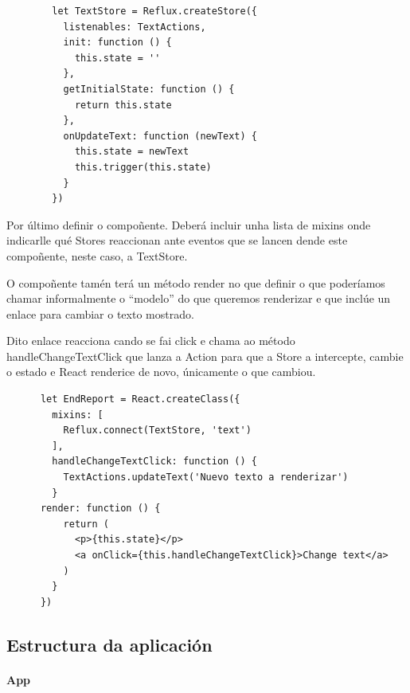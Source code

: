      \begin{lstlisting}
        let TextStore = Reflux.createStore({
          listenables: TextActions,
          init: function () {
            this.state = ''
          },
          getInitialState: function () {
            return this.state
          },
          onUpdateText: function (newText) {
            this.state = newText
            this.trigger(this.state)
          }
        })
    \end{lstlisting}

    Por último definir o compoñente. Deberá incluir unha lista de mixins onde 
indicarlle qué Stores reaccionan ante eventos que se lancen dende este 
compoñente, neste caso, a TextStore.

    O compoñente tamén terá un método render no que definir o que poderíamos 
chamar informalmente o ``modelo'' do que queremos renderizar e que inclúe un 
enlace para cambiar o texto mostrado.

    Dito enlace reacciona cando se fai click e chama ao método 
handleChangeTextClick que lanza a Action para que a Store a intercepte, cambie 
o estado e React renderice de novo, únicamente o que cambiou.



     \begin{lstlisting}
      let EndReport = React.createClass({
        mixins: [
          Reflux.connect(TextStore, 'text')
        ],
        handleChangeTextClick: function () {
          TextActions.updateText('Nuevo texto a renderizar')
        }
      render: function () {
          return (
            <p>{this.state}</p>
            <a onClick={this.handleChangeTextClick}>Change text</a>
          )
        }
      })
    \end{lstlisting}


    \subsection{Estructura da aplicación}
    
    \paragraph{App}


